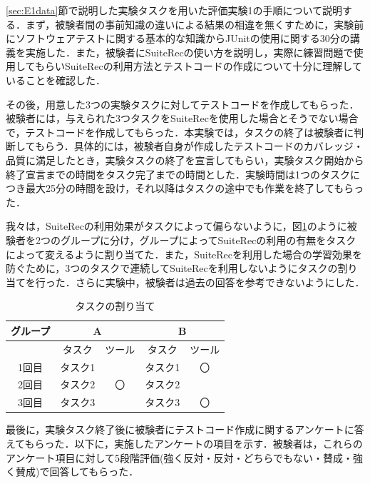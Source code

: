 \documentclass[12pt]{jarticle} %
\begin{document}
\ref{sec:E1data}節で説明した実験タスクを用いた評価実験1の手順について説明する．まず，被験者間の事前知識の違いによる結果の相違を無くすために，実験前にソフトウェアテストに関する基本的な知識からJUnitの使用に関する30分の講義を実施した．また，被験者に{\sf SuiteRec}の使い方を説明し，実際に練習問題で使用してもらい{\sf SuiteRec}の利用方法とテストコードの作成について十分に理解していることを確認した．

その後，用意した3つの実験タスクに対してテストコードを作成してもらった．被験者には，与えられた3つタスクを{\sf SuiteRec}を使用した場合とそうでない場合で，テストコードを作成してもらった．本実験では，タスクの終了は被験者に判断してもらう．具体的には，被験者自身が作成したテストコードのカバレッジ・品質に満足したとき，実験タスクの終了を宣言してもらい，実験タスク開始から終了宣言までの時間をタスク完了までの時間とした．実験時間は1つのタスクにつき最大25分の時間を設け，それ以降はタスクの途中でも作業を終了してもらった．

我々は，{\sf SuiteRec}の利用効果がタスクによって偏らないように，図\ref{assign}のように被験者を2つのグループに分け，グループによって{\sf SuiteRec}の利用の有無をタスクによって変えるように割り当てた．また，{\sf SuiteRec}を利用した場合の学習効果を防ぐために，3つのタスクで連続して{\sf SuiteRec}を利用しないようにタスクの割り当てを行った．さらに実験中，被験者は過去の回答を参考できないようにした．

\begin{table}[h]
\caption{タスクの割り当て}
\label{assign}
\begin{center}
\begin{tabular}{|c|l|l|l|c|}
\hline
グループ & \multicolumn{2}{c|}{A} & \multicolumn{2}{c|}{B} \\ \hline
& \multicolumn{1}{c|}{タスク} & \multicolumn{1}{c|}{ツール} & \multicolumn{1}{c|}{タスク} & ツール \\ \hline
1回目 & タスク1 & & タスク1 & 〇 \\ \hline
2回目 & タスク2 & \multicolumn{1}{c|}{〇} & タスク2 & \multicolumn{1}{l|}{} \\ \hline
3回目 & タスク3 & & タスク3 & 〇 \\ \hline
\end{tabular}
\end{center}
\end{table}


最後に，実験タスク終了後に被験者にテストコード作成に関するアンケートに答えてもらった．以下に，実施したアンケートの項目を示す．被験者は，これらのアンケート項目に対して5段階評価(強く反対・反対・どちらでもない・賛成・強く賛成)で回答してもらった．
\end{document}
